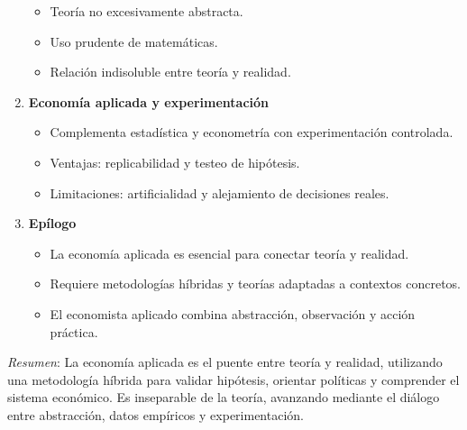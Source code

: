 \documentclass[12pt]{report} %
\providecommand{\tightlist}{%
  \setlength{\itemsep}{0pt}\setlength{\parskip}{0pt}}
\begin{document}
\begin{enumerate}
  \begin{itemize}
  \tightlist
  \item
    Teoría no excesivamente abstracta.
  \item
    Uso prudente de matemáticas.
  \item
    Relación indisoluble entre teoría y realidad.
  \end{itemize}
\item
  \textbf{Economía aplicada y experimentación}

  \begin{itemize}
  \tightlist
  \item
    Complementa estadística y econometría con experimentación
    controlada.
  \item
    Ventajas: replicabilidad y testeo de hipótesis.
  \item
    Limitaciones: artificialidad y alejamiento de decisiones reales.
  \end{itemize}
\item
  \textbf{Epílogo}

  \begin{itemize}
  \tightlist
  \item
    La economía aplicada es esencial para conectar teoría y realidad.
  \item
    Requiere metodologías híbridas y teorías adaptadas a contextos
    concretos.
  \item
    El economista aplicado combina abstracción, observación y acción
    práctica.
  \end{itemize}
\end{enumerate}

\emph{Resumen}: La economía aplicada es el puente entre teoría y
realidad, utilizando una metodología híbrida para validar hipótesis,
orientar políticas y comprender el sistema económico. Es inseparable de
la teoría, avanzando mediante el diálogo entre abstracción, datos
empíricos y experimentación.


\end{document}
